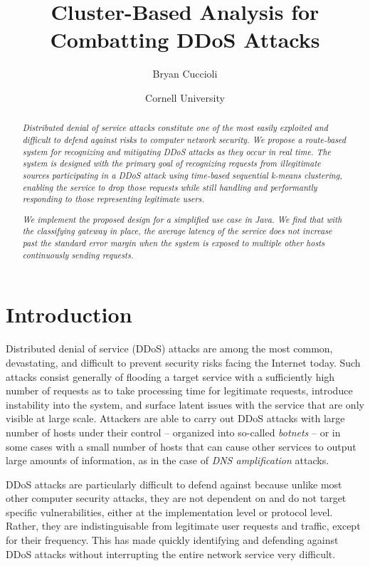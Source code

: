 \documentclass[twocolumn]{article}
\title{Cluster-Based Analysis for\\Combatting DDoS Attacks}
\author{Bryan Cuccioli}
\date{Cornell University}
\begin{document}
\maketitle

\begin{abstract}
\emph{Distributed denial of service attacks constitute one of the most easily exploited and difficult to defend against risks to computer network security. We propose a route-based system for recognizing and mitigating DDoS attacks as they occur in real time. The system is designed with the primary goal of recognizing requests from illegitimate sources participating in a DDoS attack using time-based sequential k-means clustering, enabling the service to drop those requests while still handling and performantly responding to those representing legitimate users.}

\emph{We implement the proposed design for a simplified use case in Java. We find that with the classifying gateway in place, the average latency of the service does not increase past the standard error margin when the system is exposed to multiple other hosts continuously sending requests.}
\end{abstract}

\section{Introduction}

Distributed denial of service (DDoS) attacks are among the most common, devastating, and difficult to prevent security risks facing the Internet today. Such attacks consist generally of flooding a target service with a sufficiently high number of requests as to take processing time for legitimate requests, introduce instability into the system, and surface latent issues with the service that are only visible at large scale. Attackers are able to carry out DDoS attacks with large number of hosts under their control -- organized into so-called \emph{botnets} -- or in some cases with a small number of hosts that can cause other services to output large amounts of information, as in the case of \emph{DNS amplification} attacks.

DDoS attacks are particularly difficult to defend against because unlike most other computer security attacks, they are not dependent on and do not target specific vulnerabilities, either at the implementation level or protocol level. Rather, they are indistinguisable from legitimate user requests and traffic, except for their frequency. This has made quickly identifying and defending against DDoS attacks without interrupting the entire network service very difficult.
\end{document}
